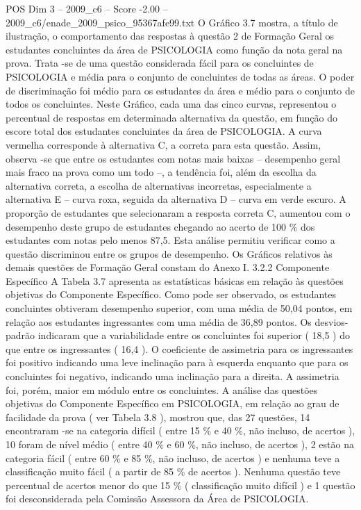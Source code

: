 \begin{textsample}{POS Dim 3 – 2009\_c6 – Score -2.00 – 2009\_c6/enade\_2009\_psico\_95367afe99.txt}
O Gráfico 3.7 mostra, a título de ilustração, o comportamento das respostas à questão 2 de Formação Geral os estudantes concluintes da área de PSICOLOGIA como função da nota geral na prova.
Trata -se de uma questão considerada fácil para os concluintes de PSICOLOGIA e média para o conjunto de concluintes de todas as áreas.
O poder de discriminação foi médio para os estudantes da área e médio para o conjunto de todos os concluintes.
Neste Gráfico, cada uma das cinco curvas, representou o percentual de respostas em determinada alternativa da questão, em função do escore total dos estudantes concluintes da área de PSICOLOGIA.
A curva vermelha corresponde à alternativa C, a correta para esta questão.
Assim, observa -se que entre os estudantes com notas mais baixas – desempenho geral mais fraco na prova como um todo –, a tendência foi, além da escolha da alternativa correta, a escolha de alternativas incorretas, especialmente a alternativa E – curva roxa, seguida da alternativa D – curva em verde escuro.
A proporção de estudantes que selecionaram a resposta correta C, aumentou com o desempenho deste grupo de estudantes chegando ao acerto de 100 \% dos estudantes com notas pelo menos 87,5.
Esta análise permitiu verificar como a questão discriminou entre os grupos de desempenho.
Os Gráficos relativos às demais questões de Formação Geral constam do Anexo I. 3.2.2 Componente Específico A Tabela 3.7 apresenta as estatísticas básicas em relação às questões objetivas do Componente Específico.
Como pode ser observado, os estudantes concluintes obtiveram desempenho superior, com uma média de 50,04 pontos, em relação aos estudantes ingressantes com uma média de 36,89 pontos.
Os desvios-padrão indicaram que a variabilidade entre os concluintes foi superior ( 18,5 ) do que entre os ingressantes ( 16,4 ).
O coeficiente de assimetria para os ingressantes foi positivo indicando uma leve inclinação para à esquerda enquanto que para os concluintes foi negativo, indicando uma inclinação para a direita.
A assimetria foi, porém, maior em módulo entre os concluintes.
A análise das questões objetivas do Componente Específico em PSICOLOGIA, em relação ao grau de facilidade da prova ( ver Tabela 3.8 ), mostrou que, das 27 questões, 14 encontraram -se na categoria difícil ( entre 15 \% e 40 \%, não incluso, de acertos ), 10 foram de nível médio ( entre 40 \% e 60 \%, não incluso, de acertos ), 2 estão na categoria fácil ( entre 60 \% e 85 \%, não incluso, de acertos ) e nenhuma teve a classificação muito fácil ( a partir de 85 \% de acertos ).
Nenhuma questão teve percentual de acertos menor do que 15 \% ( classificação muito difícil ) e 1 questão foi desconsiderada pela Comissão Assessora da Área de PSICOLOGIA.

\end{textsample}
